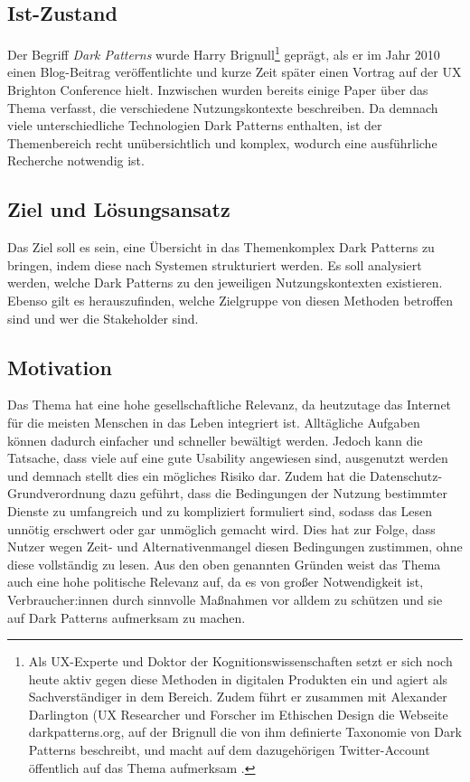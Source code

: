 \documentclass[a4paper]{article}
\begin{document}
\subsection{Ist-Zustand}
\label{sub:ist-zustand}
Der Begriff \textit{Dark Patterns} wurde Harry Brignull\footnote{\label{foot:2} Als UX-Experte und Doktor der Kognitionswissenschaften setzt er sich noch heute aktiv gegen diese Methoden in digitalen Produkten ein und agiert als Sachverständiger in dem Bereich. Zudem führt er zusammen mit Alexander Darlington (UX Researcher und Forscher im Ethischen Design die Webseite darkpatterns.org, auf der Brignull die von ihm definierte Taxonomie von Dark Patterns beschreibt, und macht auf dem dazugehörigen Twitter-Account öffentlich auf das Thema aufmerksam \cite{brignull3}\cite{brignull4}.} geprägt, als er im Jahr 2010 einen Blog-Beitrag veröffentlichte \cite{brignull1} und kurze Zeit später einen Vortrag auf der UX Brighton Conference hielt. Inzwischen wurden bereits einige Paper über das Thema verfasst, die verschiedene Nutzungskontexte beschreiben. Da demnach viele unterschiedliche Technologien Dark Patterns enthalten, ist der Themenbereich recht unübersichtlich und komplex, wodurch eine ausführliche Recherche notwendig ist.

\subsection{Ziel und Lösungsansatz}
\label{sub:ziel_und_loesungsansatz}
Das Ziel soll es sein, eine Übersicht in das Themenkomplex Dark Patterns zu bringen, indem diese nach Systemen strukturiert werden. Es soll analysiert werden, welche Dark Patterns zu den jeweiligen Nutzungskontexten existieren. Ebenso gilt es herauszufinden, welche Zielgruppe von diesen Methoden betroffen sind und wer die Stakeholder sind. 

\subsection{Motivation}
\label{motivation}
Das Thema hat eine hohe gesellschaftliche Relevanz, da heutzutage das Internet für die meisten Menschen in das Leben integriert ist. Alltägliche Aufgaben können dadurch einfacher und schneller bewältigt werden. Jedoch kann die Tatsache, dass viele auf eine gute Usability angewiesen sind, ausgenutzt werden und demnach stellt dies ein mögliches Risiko dar. 
Zudem hat die Datenschutz-Grundverordnung dazu geführt, dass die Bedingungen der Nutzung bestimmter Dienste zu umfangreich und zu kompliziert formuliert sind, sodass das Lesen unnötig erschwert oder gar unmöglich gemacht wird. Dies hat zur Folge, dass Nutzer wegen Zeit- und Alternativenmangel diesen Bedingungen zustimmen, ohne diese vollständig zu lesen.  
Aus den oben genannten Gründen weist das Thema auch eine hohe politische Relevanz auf, da es von großer Notwendigkeit ist, Verbraucher:innen durch sinnvolle Maßnahmen vor alldem zu schützen und sie auf Dark Patterns aufmerksam zu machen.
\end{document}
